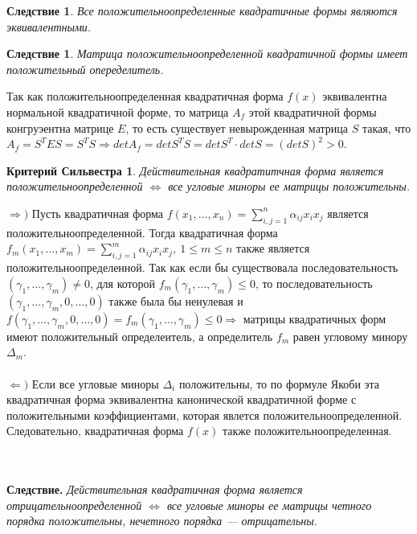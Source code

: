\newtheorem*{cor13_5_1}{Следствие}\begin{cor13_5_1}Все положительноопределенные квадратичные формы являются эквивалентными.
\end{cor13_5_1}
\newtheorem*{cor13_5_2}{Следствие}\begin{cor13_5_2}Матрица положительноопределенной квадратичной формы имеет положительный опеределитель.
\end{cor13_5_2}\begin{Proof}
	Так как положительноопределенная квадратичная форма $f(x)$ эквивалентна нормальной квадратичной форме, то матрица $A_f$ этой квадратичной формы конгруэентна матрице $E$, то есть существует невырожденная матрица $S$ такая, что $A_f=S^{T} E S = S^{T} S\Rightarrow det A_f = detS^{T} S = detS^{T} \cdot detS=  (detS)^2>0$.
\end{Proof}
\newtheorem*{th13_5_2}{Критерий Сильвестра}\begin{th13_5_2}
	Действительная квадратитчная форма является положительноопределенной $\Longleftrightarrow$ все угловые миноры ее матрицы положительны.
\end{th13_5_2}\begin{Proof}
	$\Rightarrow )$ Пусть квадратичная форма $f(x_1,\dots,x_n) = 
	\sum_{i,j=1}^n \alpha_{ij} x_i x_j$ является положительноопределенной. Тогда квадратичная форма $f_m(x_1,\dots,x_m) = \sum_{i,j=1}^m \alpha_{ij} x_i x_j,\ 1\leqslant m\leqslant n$ также является положительноопределенной. Так как если бы существовала последовательность $(\gamma_1,\dots,\gamma_m)\ne 0$, для которой $f_m(\gamma_1,\dots,\gamma_m)\leqslant0$, то последовательность $(\gamma_1,\dots,\gamma_m,0,\dots,0)$ также была бы ненулевая и $f(\gamma_1,\dots,\gamma_m,0,\dots,0)= f_m(\gamma_1,\dots,\gamma_m)\leqslant0\Rightarrow$ матрицы квадратичных форм имеют положительный определеитель, а определитель $f_m$ равен угловому минору $\Delta_m$.\\\\
	$\Leftarrow)$ Если все угловые миноры $\Delta_i$ положительны, то по формуле Якоби эта квадратичная форма эквивалентна канонической квадратичной форме с положительными коэффициентами, которая явлется положительноопределенной. Следовательно, квадратичная форма $f(x)$ также положительноопределенная.
\end{Proof}\\\\
\textbf{Следствие.} \textit{Действительная квадратичная форма является отрицательноопределенной $\Longleftrightarrow$ все угловые миноры ее матрицы четного порядка положительны, нечетного порядка --- отрицательны.}\\\\
